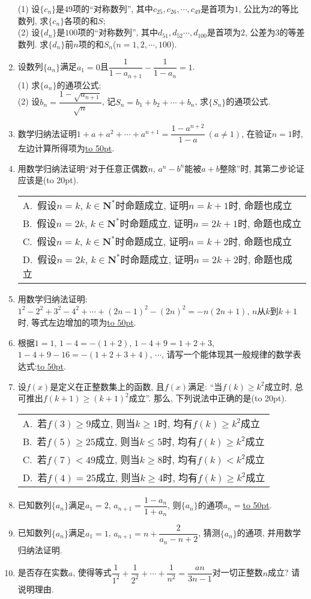 \documentclass[10pt,a4paper]{article}
\newcommand{\blank}[1]{\underline{\hbox to #1pt{}}}
\newcommand{\bracket}[1]{(\hbox to #1pt{})}
\newcommand{\onech}[4]{\par\begin{tabular}{p{.9\textwidth}}
A.~#1\\
B.~#2\\
C.~#3\\
D.~#4
\end{tabular}}
\begin{document}
\begin{enumerate}[1.]
(1) 设$\{c_n\}$是$49$项的``对称数列'', 其中$c_{25},c_{26},\cdots,c_{49}$是首项为$1$, 公比为$2$的等比数列, 求$\{c_n\}$各项的和$S$;\\
(2) 设$\{d_n\}$是$100$项的``对称数列'', 其中$d_{51},d_{52}\cdots,d_{100}$是首项为$2$, 公差为$3$的等差数列. 求$\{d_n\}$前$n$项的和$S_n$($n=1,2,\cdots,100$).
\item 设数列$\{a_n\}$满足$a_1=0$且$\dfrac 1{1-a_{n+1}}-\dfrac 1{1-a_n}=1$.\\
(1) 求$\{a_n\}$的通项公式;\\
(2) 设$b_n=\dfrac{1-\sqrt{a_{n+1}}}{\sqrt n}$, 记$S_n={b_1}+{b_2}+\cdots +b_n$, 求$\{S_n\}$的通项公式.




\item 数学归纳法证明$1+a+a^2+\cdots+a^{n+1}=\dfrac{1-a^{n+2}}{1-a}\ (a\ne 1)$, 在验证$n=1$时, 左边计算所得项为\blank{50}.
\item 用数学归纳法证明``对于任意正偶数$n$, $a^n-b^n$能被$a+b$整除''时, 其第二步论证应该是\bracket{20}.
\onech{假设$n=k$, $k\in \mathbf{N}^*$时命题成立, 证明$n=k+1$时, 命题也成立}{假设$n=2k$, $k\in \mathbf{N}^*$时命题成立, 证明$n=2k+1$时, 命题也成立}{假设$n=k$, $k\in \mathbf{N}^*$时命题成立, 证明$n=k+2$时, 命题也成立}{假设$n=2k$, $k\in \mathbf{N}^*$时命题成立, 证明$n=2k+2$时, 命题也成立}\item 用数学归纳法证明: $1^2-2^2+3^2-4^2+\cdots+(2n-1)^2-(2n)^2=-n(2n+1)$, $n$从$k$到$k+1$时, 等式左边增加的项为\blank{50}.
\item 根据$1=1$, $1-4=-(1+2)$, $1-4+9=1+2+3$, $1-4+9-16=-(1+2+3+4)$, $\cdots$, 请写一个能体现其一般规律的数学表达式:\blank{50}.
\item 设$f(x)$是定义在正整数集上的函数, 且$f(x)$满足: ``当$f(k)\ge k^2$成立时, 总可推出$f(k+1)\ge (k+1)^2$成立''. 那么, 下列说法中正确的是\bracket{20}.
\onech{若$f(3)\ge 9$成立, 则当$k\ge 1$时, 均有$f(k)\ge k^2$成立}{若$f(5)\ge 25$成立, 则当$k\le 5$时, 均有$f(k)\ge k^2$成立}{若$f(7)<49$成立, 则当$k\ge 8$时, 均有$f(k)<k^2$成立}{若$f(4)=25$成立, 则当$k\ge 4$时, 均有$f(k)\ge k^2$成立 }
\item 已知数列$\{a_n\}$满足$a_1=2$, $a_{n+1}=\dfrac{1-a_n}{1+a_n}$, 则$\{a_n\}$的通项$a_n=$\blank{50}.
\item 已知数列$\{a_n\}$满足$a_1=1$, $a_{n+1}=n+\dfrac 2{a_n-n+2}$, 猜测$\{a_n\}$的通项, 并用数学归纳法证明.
\item 是否存在实数$a$, 使得等式$\dfrac 1{1^2}+\dfrac 1{2^2}+\cdots +\dfrac 1{n^2}=\dfrac{an}{3n-1}$对一切正整数$n$成立? 请说明理由.

\end{enumerate}
\end{document}
